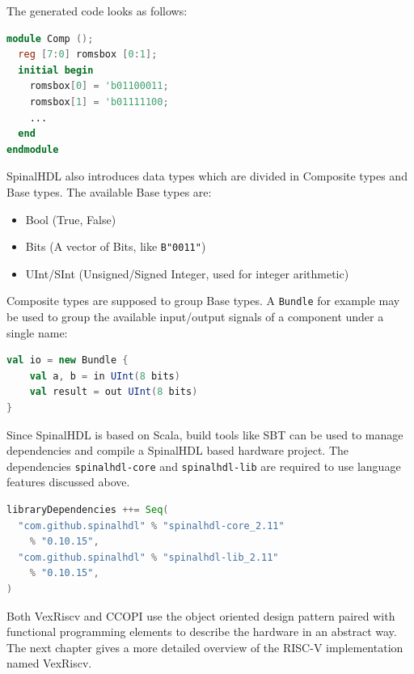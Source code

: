 \documentclass[twoside,twocolumn]{article}
\newcommand{\code}[1]{\texttt{#1}}
\begin{document}
\noindent The generated code looks as follows:
\begin{lstlisting}[language=verilog]
module Comp ();
  reg [7:0] romsbox [0:1];
  initial begin
    romsbox[0] = 'b01100011;
    romsbox[1] = 'b01111100;
    ...
  end
endmodule
\end{lstlisting}
SpinalHDL also introduces data types which are divided in Composite
types and Base types. The available Base types are:
\begin{itemize}
    \item Bool (True, False)
    \item Bits (A vector of Bits, like \code{B"0011"})
    \item UInt/SInt (Unsigned/Signed Integer, used for integer
        arithmetic)
\end{itemize}
Composite types are supposed to group Base types. A \code{Bundle} for
example may be used to group the available input/output signals of a
component under a single name:
\begin{lstlisting}[language=scala]
val io = new Bundle {
    val a, b = in UInt(8 bits)
    val result = out UInt(8 bits)
}
\end{lstlisting}
Since SpinalHDL is based on Scala, build tools like SBT can be used to
manage dependencies and compile a SpinalHDL based hardware project. The
dependencies \code{spinalhdl-core} and \code{spinalhdl-lib} are required
to use language features discussed above.
\begin{lstlisting}[language=scala]
libraryDependencies ++= Seq(
  "com.github.spinalhdl" % "spinalhdl-core_2.11" 
    % "0.10.15",
  "com.github.spinalhdl" % "spinalhdl-lib_2.11" 
    % "0.10.15",
)
\end{lstlisting}

Both VexRiscv and CCOPI use the object oriented design pattern paired
with functional programming elements to describe the hardware in an
abstract way. The next chapter gives a more detailed overview of the
RISC-V implementation named VexRiscv.
\end{document}
